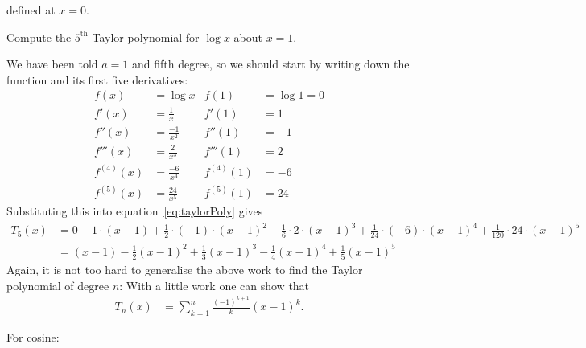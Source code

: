 defined at $x=0$.
\begin{eg}\label{eg expand logx}
Compute the $5^\mathrm{th}$ Taylor polynomial for $\log x$ about $x=1$.

\soln We have been told $a=1$ and fifth degree, so we should start by writing down the
function and its first five derivatives:
\begin{align*}
  f(x) &= \log x & f(1) &= \log 1 = 0 \\
  f'(x) &= \frac{1}{x} & f'(1) &= 1 \\
  f''(x) &= \frac{-1}{x^2} & f''(1) &= -1 \\
  f'''(x) &= \frac{2}{x^3} & f'''(1) &= 2 \\
  f^{(4)}(x) &= \frac{-6}{x^4} & f^{(4)}(1) &= -6 \\
  f^{(5)}(x) &= \frac{24}{x^5} & f^{(5)}(1) &= 24
\end{align*}
Substituting this into equation~\eqref{eq:taylorPoly} gives
\begin{align*}
  T_5(x)&= 0 + 1\cdot (x-1)
  + \frac{1}{2} \cdot (-1) \cdot (x-1)^2
  + \frac{1}{6} \cdot 2 \cdot (x-1)^3
  + \frac{1}{24} \cdot (-6) \cdot (x-1)^4
  + \frac{1}{120} \cdot 24 \cdot (x-1)^5 \\
  &= (x-1) - \frac{1}{2}(x-1)^2 + \frac{1}{3}(x-1)^3 - \frac{1}{4}(x-1)^4 +
\frac{1}{5}(x-1)^5
\end{align*}
Again, it is not too hard to generalise the above work to find the Taylor polynomial of
degree $n$:
With a little work one can show that
\begin{align*}
  T_n(x) &= \sum_{k=1}^n \frac{(-1)^{k+1}}{k} (x-1)^k.
\end{align*}
\end{eg}
For cosine:
